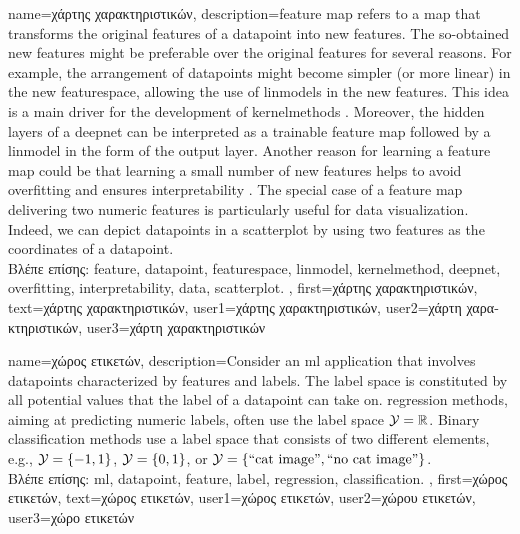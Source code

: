 {name={\foreignlanguage{greek}{χάρτης χαρακτηριστικών}}, 
	description={\Gls{feature} map refers to a map 
		that transforms the original \gls{feature}s of a \gls{datapoint} into new \gls{feature}s. The 
		so-obtained new \gls{feature}s might be preferable over the original \gls{feature}s for 
		several reasons. For example, the arrangement of \gls{datapoint}s might become 
		simpler (or more linear) in the new \gls{featurespace}, allowing the use of \gls{linmodel}s 
		in the new \gls{feature}s. This idea is a main driver for the development of \gls{kernelmethod}s \cite{LearningKernelsBook}. 
		Moreover, the hidden layers of a \gls{deepnet} can be interpreted as a trainable \gls{feature} map 
		followed by a \gls{linmodel} in the form of the output layer. Another reason for learning a \gls{feature} map
		could be that learning a small number of new \gls{feature}s helps to avoid \gls{overfitting} and 
		ensures \gls{interpretability} \cite{Ribeiro2016}. The special case of a \gls{feature} map delivering 
		two numeric \gls{feature}s is particularly useful for \gls{data} visualization. Indeed, we can depict 
		\gls{datapoint}s in a \gls{scatterplot} by using two \gls{feature}s as the coordinates of a \gls{datapoint}.\\
		\foreignlanguage{greek}{Βλέπε επίσης:} \gls{feature}, \gls{datapoint}, \gls{featurespace}, \gls{linmodel}, \gls{kernelmethod}, \gls{deepnet}, \gls{overfitting}, \gls{interpretability}, \gls{data}, \gls{scatterplot}. },
	first={\foreignlanguage{greek}{χάρτης χαρακτηριστικών}},
	text={\foreignlanguage{greek}{χάρτης χαρακτηριστικών}},
	user1={\foreignlanguage{greek}{χάρτης χαρακτηριστικών}}, %
  	user2={\foreignlanguage{greek}{χάρτη χαρακτηριστικών}}, %
	user3={\foreignlanguage{greek}{χάρτη χαρακτηριστικών}} %
}

{name={\foreignlanguage{greek}{χώρος ετικετών}},
	description={Consider an \gls{ml} application that involves \gls{datapoint}s characterized by \gls{feature}s 
		and \gls{label}s. The \gls{label} space is constituted by all potential values that the \gls{label} 
		of a \gls{datapoint} can take on. \Gls{regression} methods, aiming at predicting numeric \gls{label}s, often
		 use the \gls{label} space $\mathcal{Y} = \mathbb{R}$. Binary \gls{classification} methods use a \gls{label} space 
 		that consists of two different elements, e.g., $\mathcal{Y} =\{-1,1\}$, $\mathcal{Y}=\{0,1\}$, 
		or $\mathcal{Y} = \{ \mbox{``cat image''}, \mbox{``no cat image''} \}$.\\
		\foreignlanguage{greek}{Βλέπε επίσης:} \gls{ml}, \gls{datapoint}, \gls{feature}, \gls{label}, \gls{regression}, \gls{classification}.
		}, first={\foreignlanguage{greek}{χώρος ετικετών}},
		text={\foreignlanguage{greek}{χώρος ετικετών}},
		user1={\foreignlanguage{greek}{χώρος ετικετών}}, %
  		user2={\foreignlanguage{greek}{χώρου ετικετών}}, %
		user3={\foreignlanguage{greek}{χώρο ετικετών}} %
}

